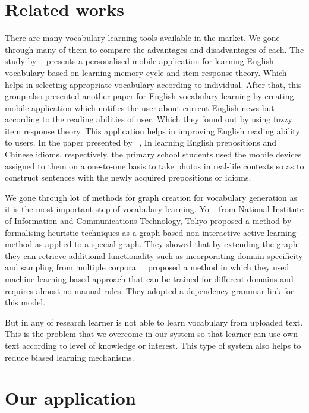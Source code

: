 \documentclass[11pt,a4paper]{article}
\begin{document}
\section{Related works}
There are many vocabulary learning tools available in the market.
We gone through many of them to compare the advantages and disadvantages of each.
The study by ~\citet{chen2008personalized} presents a personalised mobile application for
learning English vocabulary based on learning memory cycle and item response theory.
Which helps in selecting appropriate vocabulary according to individual.
After that, this group also presented another paper for English vocabulary
learning by creating mobile application which notifies the user about current
English news but according to the reading abilities of user. Which they found out
by using fuzzy item response theory. This application helps in improving English reading ability to users.
In the paper presented by ~\citet{wong2010mobile}, In learning English prepositions and Chinese idioms, respectively,
the primary school students used the mobile devices assigned to them on a one-to-one basis
to take photos in real-life contexts so as to construct sentences with the newly acquired prepositions or idioms.

We gone through lot of methods for graph creation for vocabulary generation as
it is the most important step of vocabulary learning. Yo ~\citet{ehara2014formalizing}
from National Institute of Information and Communications Technology, Tokyo proposed
a method by formalising heuristic techniques as a graph-based non-interactive active
learning method as applied to a special graph. They showed that by extending the graph
they can retrieve additional functionality such as incorporating domain specificity and sampling from multiple corpora.
~\citet{zhang2001learning} proposed a method in which they used machine learning based approach
that can be trained for different domains and requires almost no manual rules.
They adopted a dependency grammar link for this model.

But in any of research learner is not able to learn vocabulary from uploaded text.
This is the problem that we overcome in our system so that learner can use own text
according to level of knowledge or interest. This type of system also helps to reduce biased learning mechanisms.

\section{Our application}
\end{document}

